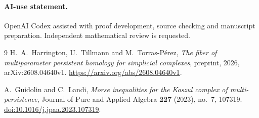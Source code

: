 \documentclass[11pt]{article}
\begin{document}
\paragraph{AI-use statement.}
OpenAI Codex assisted with proof development, source checking and
manuscript preparation. Independent mathematical review is requested.

\begin{thebibliography}{9}
H.~A.~Harrington, U.~Tillmann and M.~Torras-P\'erez,
\emph{The fiber of multiparameter persistent homology for simplicial
complexes}, preprint, 2026, arXiv:2608.04640v1.
\url{https://arxiv.org/abs/2608.04640v1}.

A.~Guidolin and C.~Landi,
\emph{Morse inequalities for the Koszul complex of multi-persistence},
Journal of Pure and Applied Algebra \textbf{227} (2023), no.~7, 107319.
\href{https://doi.org/10.1016/j.jpaa.2023.107319}{doi:10.1016/j.jpaa.2023.107319}.
\end{thebibliography}
\end{document}
